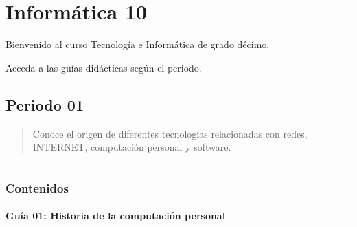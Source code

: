 \documentclass[letterpaper,10pt,spanish]{sphinxmanual}
\begin{document}
\chapter{Informática 10}
\label{\detokenize{cursos/informatica10/index:informatica-10}}\label{\detokenize{cursos/informatica10/index::doc}}
\sphinxAtStartPar
Bienvenido al curso Tecnología e Informática de grado décimo.

\sphinxAtStartPar
Acceda a las guías didácticas según el periodo.

\sphinxstepscope


\section{Periodo 01}
\label{\detokenize{cursos/informatica10/periodo01/index:periodo-01}}\label{\detokenize{cursos/informatica10/periodo01/index::doc}}\begin{quote}\begin{description}
\sphinxAtStartPar
Conoce el origen de diferentes tecnologías relacionadas con redes, INTERNET, computación personal y software.

\end{description}\end{quote}


\bigskip\hrule\bigskip



\subsection{Contenidos}
\label{\detokenize{cursos/informatica10/periodo01/index:contenidos}}
\sphinxstepscope


\subsubsection{Guía 01: Historia de la computación personal}
\label{\detokenize{cursos/informatica10/periodo01/G01:guia-01-historia-de-la-computacion-personal}}\label{\detokenize{cursos/informatica10/periodo01/G01::doc}}
\end{document}
